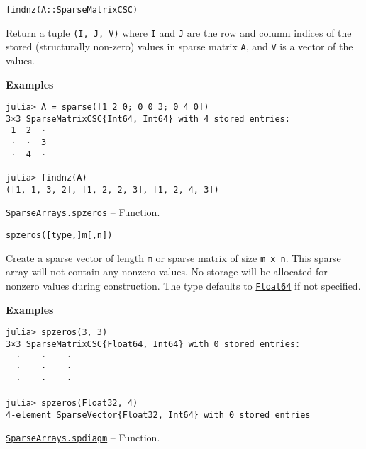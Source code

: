 \begin{adjustwidth}{2em}{0pt}


\begin{verbatim}
findnz(A::SparseMatrixCSC)
\end{verbatim}

Return a tuple \texttt{(I, J, V)} where \texttt{I} and \texttt{J} are the row and column indices of the stored ({\textquotedbl}structurally non-zero{\textquotedbl}) values in sparse matrix \texttt{A}, and \texttt{V} is a vector of the values.

\textbf{Examples}


\begin{verbatim}
julia> A = sparse([1 2 0; 0 0 3; 0 4 0])
3×3 SparseMatrixCSC{Int64, Int64} with 4 stored entries:
 1  2  ⋅
 ⋅  ⋅  3
 ⋅  4  ⋅

julia> findnz(A)
([1, 1, 3, 2], [1, 2, 2, 3], [1, 2, 4, 3])
\end{verbatim}



\end{adjustwidth}
\hypertarget{10306793690101482847}{}
\hyperlink{10306793690101482847}{\texttt{SparseArrays.spzeros}}  -- {Function.}

\begin{adjustwidth}{2em}{0pt}


\begin{verbatim}
spzeros([type,]m[,n])
\end{verbatim}

Create a sparse vector of length \texttt{m} or sparse matrix of size \texttt{m x n}. This sparse array will not contain any nonzero values. No storage will be allocated for nonzero values during construction. The type defaults to \hyperlink{5027751419500983000}{\texttt{Float64}} if not specified.

\textbf{Examples}


\begin{verbatim}
julia> spzeros(3, 3)
3×3 SparseMatrixCSC{Float64, Int64} with 0 stored entries:
  ⋅    ⋅    ⋅
  ⋅    ⋅    ⋅
  ⋅    ⋅    ⋅

julia> spzeros(Float32, 4)
4-element SparseVector{Float32, Int64} with 0 stored entries
\end{verbatim}



\end{adjustwidth}
\hypertarget{10407455986460913397}{}
\hyperlink{10407455986460913397}{\texttt{SparseArrays.spdiagm}}  -- {Function.}


